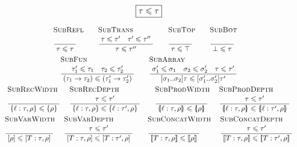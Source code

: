 \renewcommand\arraystretch{1.3}
$$\boxed{\tau \leqslant \tau}$$
\vspace{-1.5em}
\small
$$ \begin{array}{c}
\irule{SubRefl}{}{\tau \sub \tau} \quad 
\irule{SubTrans}{\tau \sub \tau' \quad \tau' \sub \tau''}{\tau \sub \tau''} \quad
\irule{SubTop}{}{\tau \sub \top} \quad 
\irule{SubBot}{}{\bot \sub \tau} \quad 
\\
\irule{SubFun}{\tau_1' \sub \tau_1 \quad \tau_2 \sub \tau_2'}{(\tau_1 \sfntype \tau_2) \sub (\tau_1' \sfntype \tau_2')} \quad 
{
\irule{SubArray}{\sigma_1' \sub \sigma_1 \quad \sigma_2 \sub \sigma_2' \quad \tau \sub \tau'}{\sarraytype{\sigma_1}{\sigma_2}{\tau} \sub \sarraytype{\sigma_1'}{\sigma_2'}{\tau'}} } \\
\irule{SubRecWidth}{}{\srecordtype{\ell: \tau, \rho} \sub \srecordtype{\rho}} \;
\irule{SubRecDepth}{\tau \sub \tau'}{\srecordtype{\ell: \tau, \rho} \sub \srecordtype{\ell : \tau', \rho}} \quad 
\irule{SubProdWidth}{}{\sproducttype{\ell: \tau, \rho} \sub \sproducttype{\rho}} \;
\irule{SubProdDepth}{\tau \sub \tau'}{\sproducttype{\ell: \tau, \rho} \sub \sproducttype{\ell : \tau', \rho}} \\
\irule{SubVarWidth}{}{\svarianttype{\rho} \sub \svarianttype{T: \tau, \rho}} \;
\irule{SubVarDepth}{\tau \sub \tau'}{\svarianttype{T: \tau, \rho} \sub \svarianttype{T : \tau', \rho}} \quad 
\irule{SubConcatWidth}{}{\sconcattype{T: \tau, \rho} \sub \sconcattype{\rho}} \;
\irule{SubConcatDepth}{\tau \sub \tau'}{\sconcattype{T: \tau, \rho} \sub \sconcattype{T : \tau', \rho}} 
\end{array} $$